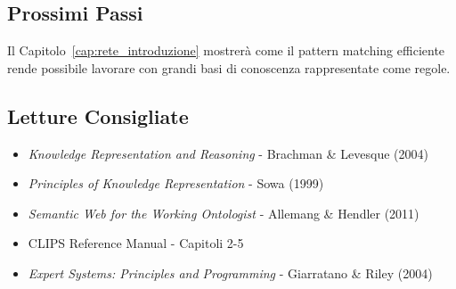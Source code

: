 \subsection{Prossimi Passi}

Il Capitolo~\ref{cap:rete_introduzione} mostrerà come il pattern matching efficiente rende possibile lavorare con grandi basi di conoscenza rappresentate come regole.

\subsection{Letture Consigliate}

\begin{itemize}
\item \textit{Knowledge Representation and Reasoning} - Brachman \& Levesque (2004)
\item \textit{Principles of Knowledge Representation} - Sowa (1999)
\item \textit{Semantic Web for the Working Ontologist} - Allemang \& Hendler (2011)
\item CLIPS Reference Manual - Capitoli 2-5
\item \textit{Expert Systems: Principles and Programming} - Giarratano \& Riley (2004)
\end{itemize}
